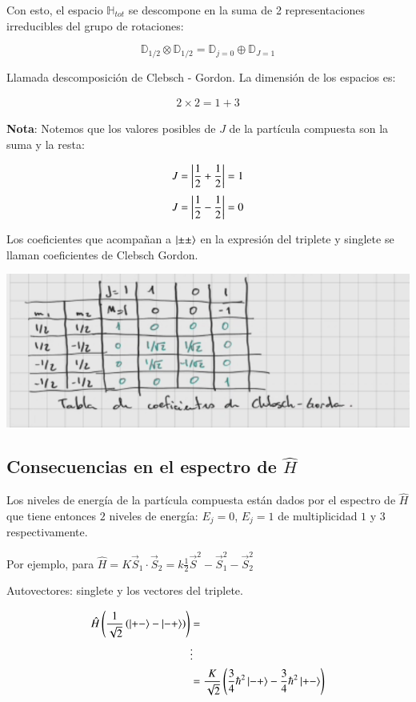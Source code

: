 Con esto, el espacio $\mathbb{H}_{tot}$ se descompone en la suma de 2 representaciones irreducibles del grupo de rotaciones:

$$\mathbb{D}_{1/2}\otimes\mathbb{D}_{1/2}=\mathbb{D}_{j=0}\oplus\mathbb{D}_{J=1}$$

Llamada descomposición de Clebsch - Gordon. La dimensión de los espacios es:

\begin{align*}
    2\times2=1+3
\end{align*}

\textbf{Nota}: Notemos que los valores posibles de $J$ de la partícula compuesta son la suma y la resta:

\begin{align*}
    J=\abs{\frac{1}{2}+\frac{1}{2}}=1
\end{align*}
\begin{align*}
    J=\abs{\frac{1}{2}-\frac{1}{2}}=0
\end{align*}

Los coeficientes que acompañan a $\ket{\pm\pm}$ en la expresión del triplete y singlete se llaman coeficientes de Clebsch Gordon.


\includegraphics{Graficas/G1-Aug9.png}


\subsection{Consecuencias en el espectro de $\hat{H}$}

Los niveles de energía de la partícula compuesta están dados por el espectro de $\hat{H}$ que tiene entonces $2$ niveles de energía: $E_j=0$, $E_j=1$ de multiplicidad $1$ y $3$ respectivamente.

Por ejemplo, para $\hat{H}=K \vec{S}_1\cdot\vec{S}_2=k\frac{1}{2}\vec{S}^2-\vec{S}_1^2-\vec{S}_2^2$

Autovectores: singlete y los vectores del triplete.

\begin{align*}
    \hat{H}\left(\frac{1}{\sqrt{2}}\left(\ket{+-}-\ket{-+}\right)\right)&=\\
    &\vdots\\
    &=\frac{K}{\sqrt{2}}\left(\frac{3}{4}\hbar^2\ket{-+}-\frac{3}{4}\hbar^2\ket{+-}\right)
\end{align*}


